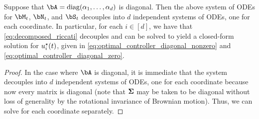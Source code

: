 \begin{lemma}\label{lem:original_objective_solution_scalar}
    Suppose that $\bA = \diag(\alpha_1, \dots, \alpha_d)$ is diagonal.  Then the above system of ODEs for $\bM_t$, $\bN_t$, and $\bS_t$ decouples into $d$ independent systems of ODEs, one for each coordinate.  In particular, for each $i \in [d]$, we have that \eqref{eq:decomposed_riccati} decouples and can be solved to yield a closed-form solution for $u^{\star}_i(t)$, given in \eqref{eq:optimal_controller_diagonal_nonzero} and \eqref{eq:optimal_controller_diagonal_zero}.
\end{lemma}
\begin{proof}
    In the case where $\bA$ is diagonal, it is immediate that the system decouples into $d$ independent systems of ODEs, one for each coordinate because now every matrix is diagonal (note that $\mathbf{\Sigma}$ may be taken to be diagonal without loss of generality by the rotational invariance of Brownian motion).  Thus, we can solve for each coordinate separately.  
    

\end{proof}
